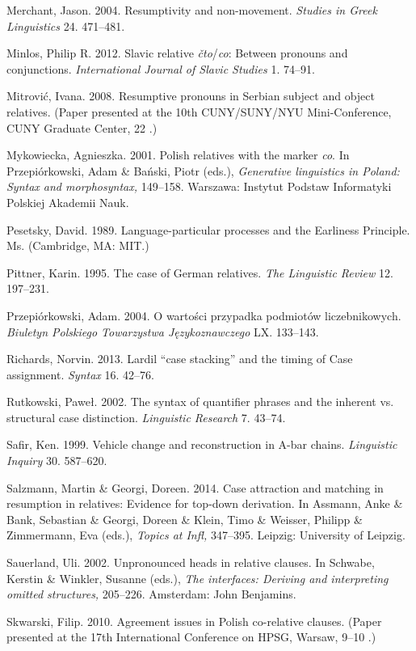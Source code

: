 \documentclass[output=paper]{langsci/langscibook}
\begin{document}
Merchant, Jason. 2004. Resumptivity and non-movement. \textit{Studies in Greek Linguistics} 24. 471–481. 

Minlos, Philip R. 2012. Slavic relative \textit{čto}/\textit{co}: Between pronouns and conjunctions. \textit{International Journal of Slavic Studies} 1. 74–91.

Mitrović, Ivana. 2008. Resumptive pronouns in Serbian subject and object relatives. (Paper presented at the 10th CUNY/SUNY/NYU Mini-Conference, CUNY Graduate Center, 22 \citealt{November2008}.)

Mykowiecka, Agnieszka. 2001. Polish relatives with the marker \textit{co}. In Przepiórkowski, Adam \& Bański, Piotr (eds.), \textit{Generative linguistics in Poland: Syntax and morphosyntax,} 149–158. Warszawa: Instytut Podstaw Informatyki Polskiej Akademii Nauk. 

Pesetsky, David. 1989. Language-particular processes and the Earliness Principle. Ms. (Cambridge, MA: MIT.)

Pittner, Karin. 1995. The case of German relatives. \textit{The Linguistic Review} 12. 197–231.

Przepiórkowski, Adam. 2004. O wartości przypadka podmiotów liczebnikowych. \textit{Biuletyn Polskiego Towarzystwa Językoznawczego} LX. 133–143.

Richards, Norvin. 2013. Lardil “case stacking” and the timing of Case assignment. \textit{Syntax} 16. 42–76.

Rutkowski, Paweł. 2002. The syntax of quantifier phrases and the inherent vs. structural case distinction. \textit{Linguistic Research} 7. 43–74.

Safir, Ken. 1999. Vehicle change and reconstruction in A-bar chains. \textit{Linguistic Inquiry} 30. 587–620.

Salzmann, Martin \& Georgi, Doreen. 2014. Case attraction and matching in resumption in relatives: Evidence for top-down derivation. In Assmann, Anke \& Bank, Sebastian \& Georgi, Doreen \& Klein, Timo \& Weisser, Philipp \& Zimmermann, Eva (eds.), \textit{Topics at Infl,} 347–395. Leipzig: University of Leipzig.

Sauerland, Uli. 2002. Unpronounced heads in relative clauses. In Schwabe, Kerstin \& Winkler, Susanne (eds.), \textit{The interfaces: Deriving and interpreting omitted structures,} 205–226. Amsterdam: John Benjamins.

Skwarski, Filip. 2010. Agreement issues in Polish co-relative clauses. (Paper presented at the 17th International Conference on HPSG, Warsaw, 9–10 \citealt{July2010}.)
\end{document}
